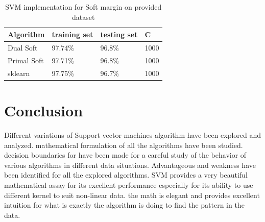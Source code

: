 \documentclass[10pt,twocolumn,letterpaper]{article}
\begin{document}
\begin{table}[htb]
\centering
\begin{tabular}{|l|l|l|l|} 
\toprule
Algorithm   & training set & testing set & C     \\ 
\hline
Dual Soft   & 97.74\%      & 96.8\%      & 1000  \\ 
\hline
Primal Soft & 97.71\%      & 96.8\%      & 1000  \\ 
\hline
sklearn     & 97.75\%      & 96.7\%      & 1000  \\
\bottomrule
\end{tabular}
\caption{SVM implementation for Soft margin on provided dataset}
\label{tab:SVM_soft_data}
\end{table}

\section{Conclusion}
Different variations of Support vector machines algorithm have been explored and analyzed. mathematical formulation of all the algorithms have been studied. decision boundaries for have been made for a careful study of the behavior of various algorithms in different data situations. Advantageous and weakness have been identified for all the explored algorithms. SVM provides a very beautiful mathematical assay for its excellent performance especially for its ability to use different kernel to suit non-linear data. the math is elegant and provides excellent intuition for what is exactly the algorithm is doing to find the pattern in the data. 


 

\end{document}

